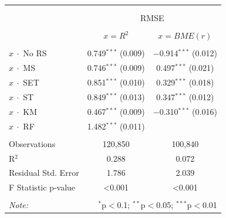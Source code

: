 \begin{tabular}{@{\extracolsep{5pt}}lcc} 
\\[-1.8ex]\hline 
\hline \\[-1.8ex] 
\\[-1.8ex] & \multicolumn{2}{c}{RMSE} \\ 
\\[-1.8ex] & $x = R^2$ & $x = BME(r)$\\ 
\hline \\[-1.8ex] 
  $x ~ \cdot$ No RS & 0.749$^{***}$ (0.009) & $-$0.914$^{***}$ (0.012) \\ 
  $x ~ \cdot$ MS & 0.746$^{***}$ (0.009) &    0.497$^{***}$ (0.021)     \\ 
  $x ~ \cdot$ SET & 0.851$^{***}$ (0.010) &   0.329$^{***}$ (0.018)     \\ 
  $x ~ \cdot$ ST & 0.849$^{***}$ (0.013) &    0.347$^{***}$ (0.012)     \\ 
  $x ~ \cdot$ KM & 0.467$^{***}$ (0.009) &    $-$0.310$^{***}$ (0.016)  \\ 
  $x ~ \cdot$ RF & 1.482$^{***}$ (0.011) &      \\ 
 \hline \\[-1.8ex] 
Observations & 120,850 & 100,840 \\ 
R$^{2}$ & 0.288 & 0.072 \\ 
Residual Std. Error & 1.786 & 2.039 \\ 
F Statistic p-value & <0.001 & <0.001 \\ 
\hline 
\hline \\[-1.8ex] 
\textit{Note:}  & \multicolumn{2}{r}{$^{*}$p$<$0.1; $^{**}$p$<$0.05; $^{***}$p$<$0.01} \\ 
\end{tabular} 
